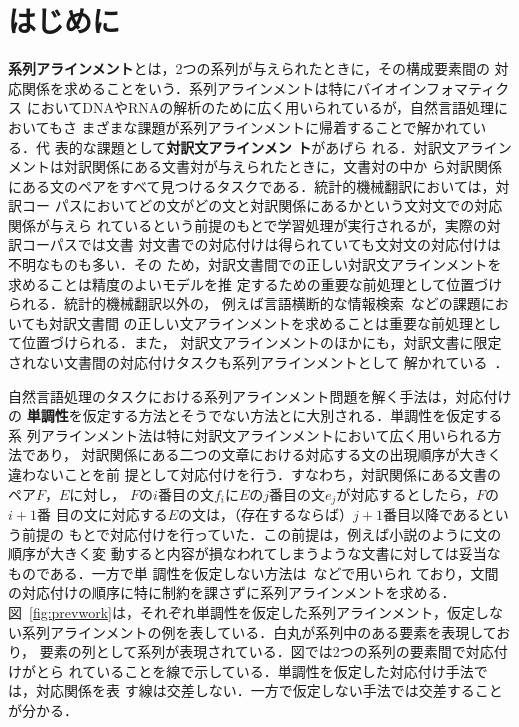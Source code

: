 \documentclass[japanese]{jnlp_1.4}
\begin{document}
\maketitle


\section{はじめに}

\textbf{系列アラインメント}とは，2つの系列が与えられたときに，その構成要素間の
対応関係を求めることをいう．系列アラインメントは特にバイオインフォマティクス
においてDNAやRNAの解析のために広く用いられているが，自然言語処理においてもさ
まざまな課題が系列アラインメントに帰着することで解かれている．代
表的な課題として\textbf{対訳文アラインメン
ト}\cite{moore02:_fast,braune10:_improv,quan-kit-song:2013:ACL2013}があげら
れる．対訳文アラインメントは対訳関係にある文書対が与えられたときに，文書対の中か
ら対訳関係にある文のペアをすべて見つけるタスクである．統計的機械翻訳においては，対訳コー
パスにおいてどの文がどの文と対訳関係にあるかという文対文での対応関係が与えら
れているという前提のもとで学習処理が実行されるが，実際の対訳コーパスでは文書
対文書での対応付けは得られていても文対文の対応付けは不明なものも多い．その
ため，対訳文書間での正しい対訳文アラインメントを求めることは精度のよいモデルを推
定するための重要な前処理として位置づけられる．統計的機械翻訳以外の，
例えば言語横断的な情報検索~\cite{nie1999cross}などの課題においても対訳文書間
の正しい文アラインメントを求めることは重要な前処理として位置づけられる．また，
対訳文アラインメントのほかにも，対訳文書に限定されない文書間の対応付けタスクも系列アラインメントとして
解かれている~\cite{qu-liu:2012:ACL2012,孝昭15,要一12}．



自然言語処理のタスクにおける系列アラインメント問題を解く手法は，対応付けの
\textbf{単調性}を仮定する方法とそうでない方法とに大別される．単調性を仮定する系
列アラインメント法は特に対訳文アラインメントにおいて広く用いられる方法であり，
対訳関係にある二つの文章における対応する文の出現順序が大きく違わないことを前
提として対応付けを行う．すなわち，対訳関係にある文書のペア$F$，$E$に対し，
$F$の$i$番目の文$f_i$に$E$の$j$番目の文$e_j$が対応するとしたら，$F$の$i+1$番
目の文に対応する$E$の文は，（存在するならば）$j+1$番目以降であるという前提の
もとで対応付けを行っていた．この前提は，例えば小説のように文の順序が大きく変
動すると内容が損なわれてしまうような文書に対しては妥当なものである．一方で単
調性を仮定しない方法は~\cite{qu-liu:2012:ACL2012,孝昭15,要一12}などで用いられ
ており，文間の対応付けの順序に特に制約を課さずに系列アラインメントを求める．
図~\ref{fig:prevwork}は，それぞれ単調性を仮定した系列アラインメント，仮定しな
い系列アラインメントの例を表している．白丸が系列中のある要素を表現しており，
要素の列として系列が表現されている．図では2つの系列の要素間で対応付けがとら
れていることを線で示している．単調性を仮定した対応付け手法では，対応関係を表
す線は交差しない．一方で仮定しない手法では交差することが分かる．
\end{document}
